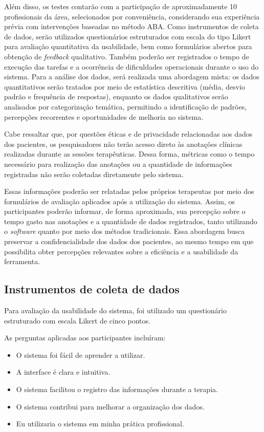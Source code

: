Além disso, os testes contarão com a participação de aproximadamente 10 profissionais da área, 
selecionados por conveniência, considerando sua experiência prévia com intervenções baseadas no método ABA. 
Como instrumentos de coleta de dados, serão utilizados questionários estruturados com escala do tipo Likert para 
avaliação quantitativa da usabilidade, bem como formulários abertos para obtenção de \textit{feedback} qualitativo. 
Também poderão ser registrados o tempo de execução das tarefas e a ocorrência de dificuldades operacionais durante 
o uso do sistema.  Para a análise dos dados, será realizada uma abordagem mista: 
os dados quantitativos serão tratados por meio de estatística descritiva (média, desvio padrão e frequência de respostas), 
enquanto os dados qualitativos serão analisados por categorização temática, permitindo a identificação de padrões, 
percepções recorrentes e oportunidades de melhoria no sistema.

Cabe ressaltar que, por questões éticas e de privacidade relacionadas aos dados dos pacientes,
os pesquisadores não terão acesso direto às anotações clínicas realizadas durante as sessões terapêuticas. 
Dessa forma, métricas como o tempo necessário para realização das anotações
ou a quantidade de informações registradas não serão coletadas diretamente pelo sistema.

Essas informações poderão ser relatadas pelos próprios terapeutas por meio dos formulários
de avaliação aplicados após a utilização do sistema. Assim, os participantes poderão informar,
de forma aproximada, sua percepção sobre o tempo gasto nas anotações e a quantidade de dados
registrados, tanto utilizando o \textit{software} quanto por meio dos métodos tradicionais.
Essa abordagem busca preservar a confidencialidade dos dados dos pacientes, ao mesmo tempo
em que possibilita obter percepções relevantes sobre a eficiência e a usabilidade da ferramenta.

\subsection{Instrumentos de coleta de dados}
Para avaliação da usabilidade do sistema, foi utilizado um questionário estruturado
com escala Likert de cinco pontos.

As perguntas aplicadas aos participantes incluíram:

\begin{itemize}
\item O sistema foi fácil de aprender a utilizar.
\item A interface é clara e intuitiva.
\item O sistema facilitou o registro das informações durante a terapia.
\item O sistema contribui para melhorar a organização dos dados.
\item Eu utilizaria o sistema em minha prática profissional.
\end{itemize}

